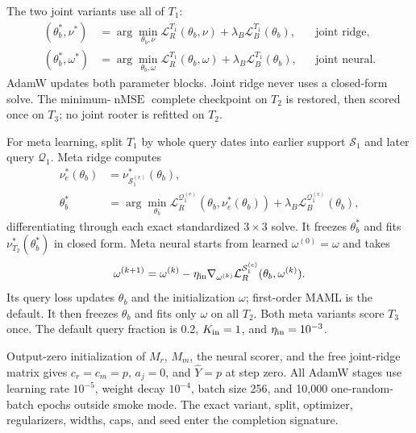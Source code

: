 \documentclass[10pt]{article}
\newcommand{\Tone}{T_1}
\newcommand{\Ttwo}{T_2}
\newcommand{\Tthree}{T_3}
\newcommand{\nMSE}{\operatorname{nMSE}}
\begin{document}
The two joint variants use all of $\Tone$:
\begin{align}
 (\theta_b^*,\nu^*)&=\arg\min_{\theta_b,\nu}
 \mathcal L_R^{\Tone}(\theta_b,\nu)+\lambda_B\mathcal L_B^{\Tone}(\theta_b),
 &&\text{joint ridge},\\
 (\theta_b^*,\omega^*)&=\arg\min_{\theta_b,\omega}
 \mathcal L_R^{\Tone}(\theta_b,\omega)+\lambda_B\mathcal L_B^{\Tone}(\theta_b),
 &&\text{joint neural}.
\end{align}
AdamW updates both parameter blocks. Joint ridge never uses a closed-form solve.
The minimum-$\nMSE$ complete checkpoint on $\Ttwo$ is restored, then scored once
on $\Tthree$; no joint rooter is refitted on $\Ttwo$.

For meta learning, split $\Tone$ by whole query dates into earlier support
$\mathcal S_1$ and later query $\mathcal Q_1$. Meta ridge computes
\begin{align}
 \nu_e^*(\theta_b)&=\nu^*_{\mathcal S_1^{(e)}}(\theta_b),\\
 \theta_b^*&=\arg\min_{\theta_b}
 \mathcal L_R^{\mathcal Q_1^{(e)}}(\theta_b,\nu_e^*(\theta_b))
 +\lambda_B\mathcal L_B^{\mathcal Q_1^{(e)}}(\theta_b),
\end{align}
differentiating through each exact standardized $3\times3$ solve. It freezes
$\theta_b^*$ and fits $\nu^*_{\Ttwo}(\theta_b^*)$ in closed form.
Meta neural starts from learned $\omega^{(0)}=\omega$ and takes
\[
 \omega^{(k+1)}=\omega^{(k)}-\eta_{\rm in}
 \nabla_{\omega^{(k)}}\mathcal L_R^{\mathcal S_1^{(e)}}
 (\theta_b,\omega^{(k)}).
\]
Its query loss updates $\theta_b$ and the initialization $\omega$; first-order
MAML is the default. It then freezes $\theta_b$ and fits only $\omega$ on all
$\Ttwo$. Both meta variants score $\Tthree$ once. The default query fraction is
0.2, $K_{\rm in}=1$, and $\eta_{\rm in}=10^{-3}$.

Output-zero initialization of $M_r$, $M_m$, the neural scorer, and the free
joint-ridge matrix gives $c_r=c_m=p$, $a_j=0$, and $\widehat Y=p$ at step zero.
All AdamW stages use learning rate $10^{-5}$, weight decay $10^{-4}$, batch size
256, and 10,000 one-random-batch epochs outside smoke mode. The exact variant,
split, optimizer, regularizers, widths, caps, and seed enter the completion
signature.
\end{document}
